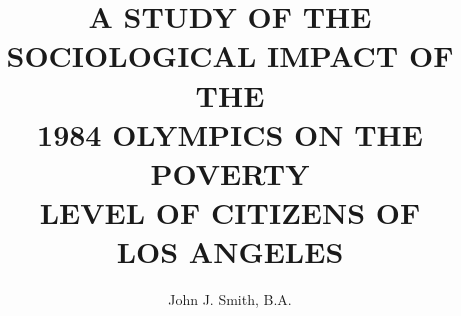 \documentclass[10pt,10pt,10pt]{mugsthesis} %
\title{ %
  A STUDY OF THE SOCIOLOGICAL IMPACT OF THE\\
  1984 OLYMPICS ON THE POVERTY\\
  LEVEL OF CITIZENS OF\\
  LOS ANGELES
} %
\author{John J. Smith, B.A.} %
\begin{document}
\maketitle                %

\frontmatter

\tableofcontents          %
\listoftables             %
\listoffigures            %

\mainmatter


\nocite{*} %


\appendix

\end{document}
